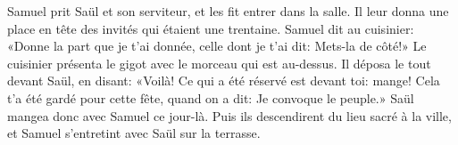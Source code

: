 Samuel prit Saül et son serviteur, et les fit entrer dans la salle.
	Il leur donna une place en tête des invités qui étaient une trentaine.
Samuel dit au cuisinier:
	«Donne la part que je t’ai donnée, celle dont je t’ai dit: Mets-la de côté!»
Le cuisinier présenta le gigot avec le morceau qui est au-dessus.
Il déposa le tout devant Saül, en disant:
	«Voilà! Ce qui a été réservé est devant toi: mange!
Cela t’a été gardé pour cette fête, quand on a dit: Je convoque le peuple.»
Saül mangea donc avec Samuel ce jour-là.
	Puis ils descendirent du lieu sacré à la ville,
	et Samuel s’entretint avec Saül sur la terrasse.
